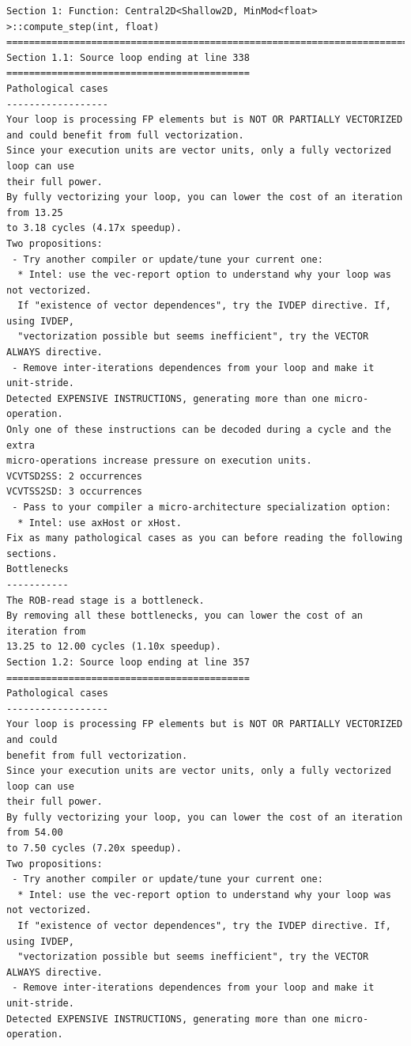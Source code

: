 \documentclass[12pt]{article}
\numberwithin{equation}{section}
\begin{document}
\scriptsize{
\begin{lstlisting}
Section 1: Function: Central2D<Shallow2D, MinMod<float> >::compute_step(int, float)
===================================================================================
Section 1.1: Source loop ending at line 338
===========================================
Pathological cases
------------------
Your loop is processing FP elements but is NOT OR PARTIALLY VECTORIZED
and could benefit from full vectorization.
Since your execution units are vector units, only a fully vectorized loop can use
their full power.
By fully vectorizing your loop, you can lower the cost of an iteration from 13.25
to 3.18 cycles (4.17x speedup).
Two propositions:
 - Try another compiler or update/tune your current one:
  * Intel: use the vec-report option to understand why your loop was not vectorized.
  If "existence of vector dependences", try the IVDEP directive. If, using IVDEP,
  "vectorization possible but seems inefficient", try the VECTOR ALWAYS directive.
 - Remove inter-iterations dependences from your loop and make it unit-stride.
Detected EXPENSIVE INSTRUCTIONS, generating more than one micro-operation.
Only one of these instructions can be decoded during a cycle and the extra
micro-operations increase pressure on execution units.
VCVTSD2SS: 2 occurrences
VCVTSS2SD: 3 occurrences
 - Pass to your compiler a micro-architecture specialization option:
  * Intel: use axHost or xHost.
Fix as many pathological cases as you can before reading the following sections.
Bottlenecks
-----------
The ROB-read stage is a bottleneck.
By removing all these bottlenecks, you can lower the cost of an iteration from
13.25 to 12.00 cycles (1.10x speedup).
Section 1.2: Source loop ending at line 357
===========================================
Pathological cases
------------------
Your loop is processing FP elements but is NOT OR PARTIALLY VECTORIZED and could
benefit from full vectorization.
Since your execution units are vector units, only a fully vectorized loop can use
their full power.
By fully vectorizing your loop, you can lower the cost of an iteration from 54.00
to 7.50 cycles (7.20x speedup).
Two propositions:
 - Try another compiler or update/tune your current one:
  * Intel: use the vec-report option to understand why your loop was not vectorized.
  If "existence of vector dependences", try the IVDEP directive. If, using IVDEP,
  "vectorization possible but seems inefficient", try the VECTOR ALWAYS directive.
 - Remove inter-iterations dependences from your loop and make it unit-stride.
Detected EXPENSIVE INSTRUCTIONS, generating more than one micro-operation.

\end{lstlisting}}
\end{document}
